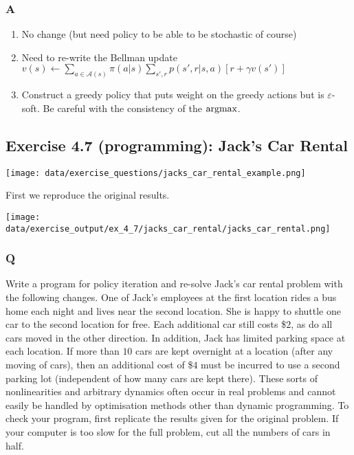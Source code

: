 \subsubsection{A}
\begin{enumerate}
    \item No change (but need policy to be able to be stochastic of course)
    \item Need to re-write the Bellman update $v(s) \leftarrow \sum_{a \in \mathcal{A}(s)} \pi(a|s)\sum_{s', r}p(s', r|s, a)\left[ r + \gamma v(s') \right]$
    \item Construct a greedy policy that puts weight on the greedy actions but is $\varepsilon$-soft. Be careful with the consistency of the $\operatorname*{argmax}$.
\end{enumerate}

\subsection{Exercise 4.7 (programming): Jack's Car Rental}

\texttt{[image: data/exercise\_questions/jacks\_car\_rental\_example.png]}

First we reproduce the original results.

\texttt{[image: data/exercise\_output/ex\_4\_7/jacks\_car\_rental/jacks\_car\_rental.png]}

\subsubsection{Q}
Write a program for policy iteration and re-solve Jack’s car rental problem with the following changes. One of Jack’s employees at the first location rides a bus home each night and lives near the second location. She is happy to shuttle one car to the second location for free. Each additional car still costs \$$2$, as do all cars moved in the other direction. In addition, Jack has limited parking space at each location. If more than $10$ cars are kept overnight at a location (after any moving of cars), then an additional cost of \$$4$ must be incurred to use a second parking lot (independent of how many cars are kept there). These sorts of nonlinearities and arbitrary dynamics often occur in real problems and cannot easily be handled by optimisation methods other than dynamic programming. To check your program, first replicate the results given for the original problem. If your computer is too slow for the full problem, cut all the numbers of cars in half.

